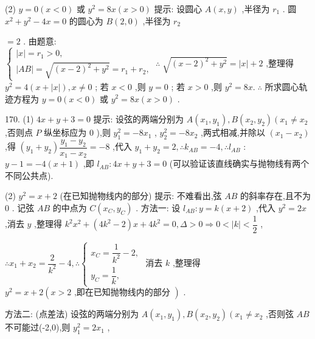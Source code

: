 (2) $y = 0\left( {x < 0}\right)$ 或 ${y}^{2} = {8x}\left( {x > 0}\right)$ 提示: 设圆心 $A\left( {x,y}\right)$ ,半径为 ${r}_{1}$ . 圆 ${x}^{2} + {y}^{2} - {4x} = 0$ 的圆心为 $B\left( {2,0}\right)$ ,半径为 ${r}_{2}$

$= 2$ . 由题意: $\left\{  {\begin{array}{l} \left| x\right|  = {r}_{1} > 0, \\  \left| {AB}\right|  = \sqrt{{\left( x - 2\right) }^{2} + {y}^{2}} = {r}_{1} + {r}_{2}, \end{array}\;\therefore \;\sqrt{{\left( x - 2\right) }^{2} + {y}^{2}} = \left| x\right|  + 2}\right.$ ,整理得 ${y}^{2} = 4\left( {x + \left| x\right| }\right) ,x \neq  0$ ; 若 $x < 0$ ,则 $y = 0$ ; 若 $x > 0$ ,则 ${y}^{2} = {8x}.\;\therefore$ 所求圆心轨迹方程为 $y = 0\left( {x < 0}\right)$ 或 ${y}^{2} = {8x}\left( {x > 0}\right)$ .

170. (1) ${4x} + y + 3 = 0$ 提示: 设弦的两端分别为 $A\left( {{x}_{1},{y}_{1}}\right) ,B\left( {{x}_{2},{y}_{2}}\right) \left( {{x}_{1} \neq  {x}_{2}}\right.$ ,否则点 $P$ 纵坐标应为 0 ),则 ${y}_{1}^{2} =  - 8{x}_{1}$ , ${y}_{2}^{2} =  - 8{x}_{2}$ ,两式相减,并除以 $\left( {{x}_{1} - {x}_{2}}\right)$ ,得 $\left( {{y}_{1} + {y}_{2}}\right) \dfrac{{y}_{1} - {y}_{2}}{{x}_{1} - {x}_{2}} =  - 8$ ,代入 ${y}_{1} + {y}_{2} = 2,\therefore {k}_{AB} =  - 4,\therefore {l}_{AB}$ : $y - 1 =  - 4\left( {x + 1}\right)$ ,即 ${l}_{AB} : {4x} + y + 3 = 0$ (可以验证该直线确实与抛物线有两个不同公共点).

(2) ${y}^{2} = x + 2$ (在已知抛物线内的部分) 提示: 不难看出,弦 ${AB}$ 的斜率存在,且不为 0 . 记弦 ${AB}$ 的中点为 $C\left( {{x}_{C},{y}_{C}}\right)$ . 方法一: 设 ${l}_{AB} : y = k\left( {x + 2}\right)$ ,代入 ${y}^{2} = {2x}$ ,消去 $y$ ,整理得 ${k}^{2}{x}^{2} + \left( {4{k}^{2} - 2}\right) x + 4{k}^{2} = 0,\Delta  > 0 \Rightarrow  0 < \left| k\right|  < \dfrac{1}{2}$ ,

$\therefore {x}_{1} + {x}_{2} = \dfrac{2}{{k}^{2}} - 4,\therefore \left\{  \begin{array}{l} {x}_{C} = \dfrac{1}{{k}^{2}} - 2, \\  {y}_{C} = \dfrac{1}{k}, \end{array}\right.$ 消去 $k$ ,整理得 ${y}^{2} = x + 2\left( {x > 2\text{ ,即在已知抛物线内的部分 }}\right)$ .

方法二: (点差法) 设弦的两端分别为 $A\left( {{x}_{1},{y}_{1}}\right) ,B\left( {{x}_{2},{y}_{2}}\right) \left( {{x}_{1} \neq  {x}_{2}}\right.$ ,否则弦 ${AB}$ 不可能过(-2,0),则 ${y}_{1}^{2} = 2{x}_{1}$ ,

